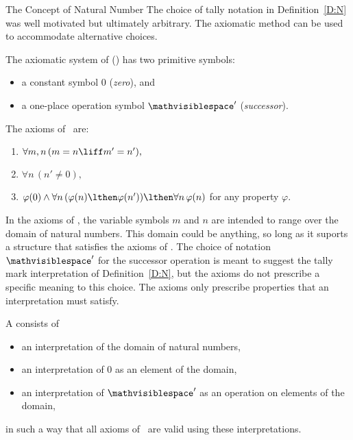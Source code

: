 \begin{unit}{The Concept of Natural Number}
The choice of tally notation in Definition~\ref{D:N} was well motivated but ultimately arbitrary.
The axiomatic method can be used to accommodate alternative choices.

\newcommand{\pax}[1]{\ensuremath{\mathsf{PA}_{\ref{PA:#1}}}}
\begin{definition}\label{D:PA}
  The axiomatic system of  \textup(\PA\textup) has two primitive symbols:
  \begin{itemize}
  \item a constant symbol \(0\) \textup (\emph{zero}\textup), and 
  \item a one-place operation symbol \(\mathvisiblespace'\) \textup(\emph{successor}\textup). 
  \end{itemize} 
  The axioms of \PA\ are: 
  \begin{enumerate}
  \item\label{PA:succ} \(\forall m, n\,(m = n \liff m' = n'),\)
  \item\label{PA:zero} \(\forall n\,(n' \neq 0),\)
  \item\label{PA:ind} \(\varphi(0) \land \forall n\,(\varphi(n) \lthen \varphi(n')) \lthen \forall n\,\varphi(n)\) for any property \(\varphi.\)
  \end{enumerate}
\end{definition}

\noindent
In the axioms of \PA, the variable symbols \(m\) and \(n\) are intended to range over the domain of natural numbers.
This domain could be anything, so long as it suports a structure that satisfies the axioms of \PA.
The choice of notation \(\mathvisiblespace'\) for the successor operation is meant to suggest the tally mark interpretation of Definition~\ref{D:N}, but the axioms do not prescribe a specific meaning to this choice.
The axioms only prescribe properties that an interpretation must satisfy.

\begin{definition}\label{D:PAModel}
  A  consists of
  \begin{itemize}
  \item an interpretation of the domain of natural numbers,
  \item an interpretation of \(0\) as an element of the domain,
  \item an interpretation of \(\mathvisiblespace'\) as an operation on elements of the domain,
  \end{itemize}
  in such a way that all axioms of \PA\ are valid using these interpretations.
\end{definition}


\end{unit}
